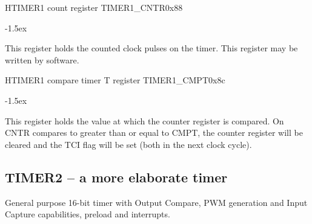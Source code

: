 \documentclass[12pt]{article}
\begin{document}
\begin{register}{H}{TIMER1 count register TIMER1\_CNTR}{0x88}
\label{timer1cntr}
\regnewline%
\end{register}
\begin{regdesc}[0.8\textwidth]\begin{reglist}[00000]
\itemsep-1.5ex
\item[CNTR] This register holds the counted clock pulses on the timer. This register may be written by software.
\end{reglist}\end{regdesc}

\begin{register}{H}{TIMER1 compare timer T register TIMER1\_CMPT}{0x8c}
\label{timer1cmpt}
\regnewline%
\end{register}
\begin{regdesc}[0.8\textwidth]\begin{reglist}[00000]
\itemsep-1.5ex
\item[CMPT] This register holds the value at which the counter register is compared. On CNTR compares to greater than or equal to CMPT, the counter register will be cleared and the TCI flag will be set (both in the next clock cycle).
\end{reglist}\end{regdesc}


\subsection{TIMER2 -- a more elaborate timer}
General purpose 16-bit timer with Output Compare, PWM generation and Input Capture capabilities, preload and interrupts.
\end{document}
